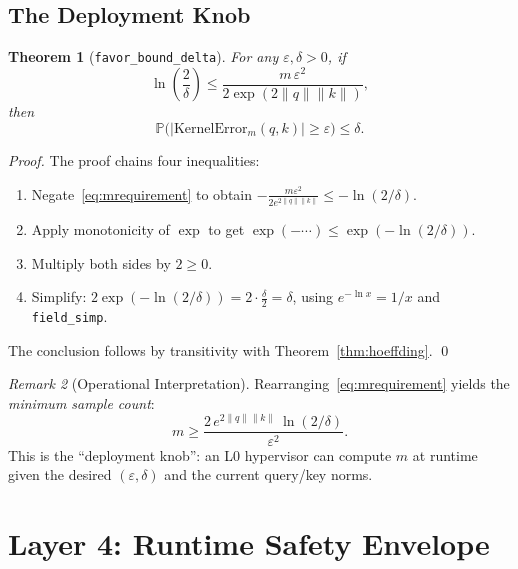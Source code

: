 \documentclass[11pt,a4paper,twocolumn]{article}
\newtheorem{theorem}{Theorem}[section]
\theoremstyle{definition}
\theoremstyle{remark}
\newtheorem{remark}[theorem]{Remark}
\newcommand{\Prob}{\mathbb{P}}
\newcommand{\leancode}[1]{\texttt{\color{leanblue}#1}}
\begin{document}
\subsection{The Deployment Knob}

\begin{theorem}[\leancode{favor\_bound\_delta}]
\label{thm:delta}
For any $\varepsilon, \delta > 0$, if
\begin{equation}
  \ln\!\left(\frac{2}{\delta}\right)
  \leq
  \frac{m\,\varepsilon^2}{2\exp(2\|q\|\|k\|)},
  \label{eq:mrequirement}
\end{equation}
then
\begin{equation}
  \Prob\!\bigl(|\mathrm{KernelError}_m(q,k)| \geq \varepsilon\bigr) \leq \delta.
\end{equation}
\end{theorem}

\begin{proof}
The proof chains four inequalities:
\begin{enumerate}[nosep]
  \item Negate~\eqref{eq:mrequirement} to obtain
        $-\frac{m\varepsilon^2}{2e^{2\|q\|\|k\|}} \leq -\ln(2/\delta)$.
  \item Apply monotonicity of $\exp$ to get
        $\exp(-\cdots) \leq \exp(-\ln(2/\delta))$.
  \item Multiply both sides by $2 \geq 0$.
  \item Simplify: $2\exp(-\ln(2/\delta)) = 2 \cdot \frac{\delta}{2} = \delta$,
        using $e^{-\ln x} = 1/x$ and \leancode{field\_simp}.
\end{enumerate}
The conclusion follows by transitivity with
Theorem~\ref{thm:hoeffding}. \qed
\end{proof}

\begin{remark}[Operational Interpretation]
Rearranging~\eqref{eq:mrequirement} yields the \emph{minimum sample count}:
\begin{equation}
  m \geq
  \frac{2\,e^{2\|q\|\|k\|}\,\ln(2/\delta)}{\varepsilon^2}.
\end{equation}
This is the ``deployment knob'': an L0 hypervisor can compute $m$ at
runtime given the desired $(\varepsilon, \delta)$ and the current query/key
norms.
\end{remark}


\section{Layer 4: Runtime Safety Envelope}
\label{sec:layer4}
\end{document}
